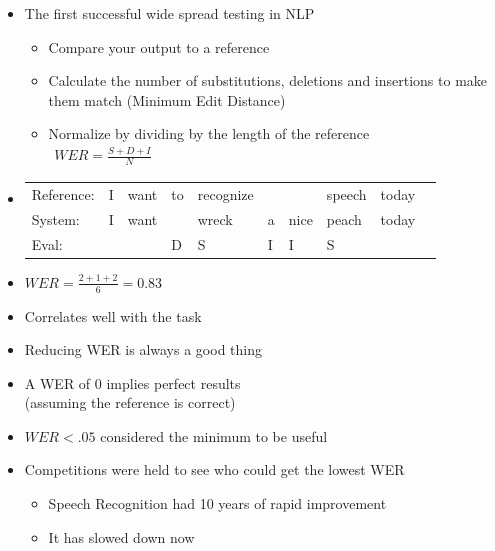 \documentclass[a4paper,landscape,headrule,footrule,xetex]{foils}
\begin{document}

\begin{itemize}
\item The first successful wide spread testing in NLP
  \begin{itemize}
  \item Compare your output to a reference
  \item Calculate the number of substitutions, deletions and insertions to make them match
(Minimum Edit Distance)
  \item Normalize by dividing by the length of the reference\\[2ex]
    {\Large
    $\begin{array}{lcr}
      WER = \frac{S+D+I}{N}
    \end{array}$
}
  \end{itemize}

\item 
  \begin{tabular}[t]{llllllllll}
    Reference: & I &want &to &recognize&  & &speech & today \\
    System:    & I &want &   &wreck    &a &nice &peach & today\\
    Eval:      &   &     & D   & S       & I & I & S \\
  \end{tabular}
\item $WER=\frac{2+1+2}{6}=0.83$
\end{itemize}



\begin{itemize}
\item Correlates well with the task
\item Reducing WER is always a good thing
\item A WER of 0 implies perfect results
  \\ (assuming the reference is correct)
\item $WER < .05$ considered the minimum to be useful
\item Competitions were held to see who could get the lowest WER
  \begin{itemize}
  \item Speech Recognition had 10 years of rapid improvement
  \item It has slowed down now
  \end{itemize}
\end{itemize}
\end{document}
